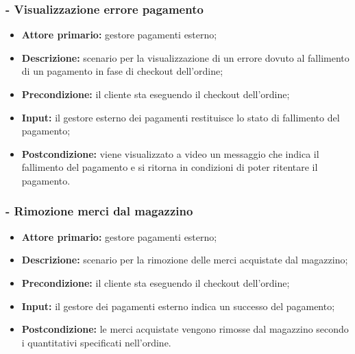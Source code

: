 \subsubsection{ - Visualizzazione errore pagamento}
\begin{itemize}
    \item \textbf{Attore primario:} gestore pagamenti esterno;
    \item \textbf{Descrizione:} scenario per la visualizzazione di un errore dovuto al fallimento di un pagamento in fase di checkout dell'ordine;
    \item \textbf{Precondizione:} il cliente sta eseguendo il checkout dell'ordine;
    \item \textbf{Input:} il gestore esterno dei pagamenti restituisce lo stato di fallimento del pagamento;
    \item \textbf{Postcondizione:} viene visualizzato a video un messaggio che indica il fallimento del pagamento e si ritorna in condizioni di poter ritentare il pagamento.
\end{itemize}

\stepsubUserCase
\subsubsection{ - Rimozione merci dal magazzino}
\begin{itemize}
    \item \textbf{Attore primario:} gestore pagamenti esterno;
    \item \textbf{Descrizione:} scenario per la rimozione delle merci acquistate dal magazzino;
    \item \textbf{Precondizione:} il cliente sta eseguendo il checkout dell'ordine;
    \item \textbf{Input:} il gestore dei pagamenti esterno indica un successo del pagamento;
    \item \textbf{Postcondizione:} le merci acquistate vengono rimosse dal magazzino secondo i quantitativi specificati nell'ordine.
\end{itemize}

\stepUserCase
